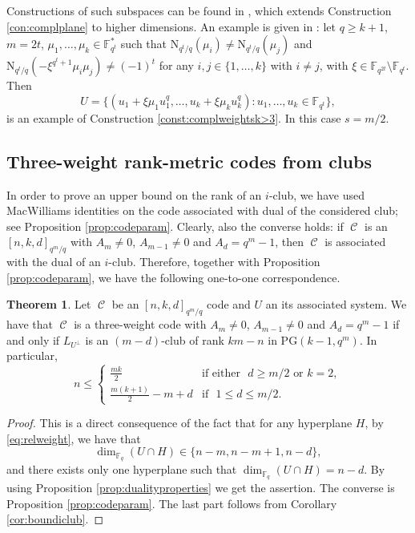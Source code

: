 \documentclass[11pt]{amsart}
\DeclareMathOperator{\C}{\mathcal{C}}
\theoremstyle{definition}
\newtheorem{theorem}{Theorem}[section]
\newcommand{\F}{{\mathbb F}}
\newcommand{\fq}{{\mathbb F}_{q}}
\newcommand{\N}{\mathrm{N}}
\begin{document}
Constructions of such subspaces can be found in \cite{zullo2021multi}, which extends Construction \ref{con:complplane} to higher dimensions.
An example is given in \cite[Corollary 6.8]{zullo2021multi}:
let $q\geq k+1$, $m=2t$, $\mu_1,\ldots,\mu_k \in \F_{q^t}^*$ such that $\N_{q^t/q}(\mu_i) \neq \N_{q^t/q}(\mu_j)$ and $\N_{q^{t}/q}(-\xi^{q^t+1}\mu_i\mu_j)\neq (-1)^t$ for any $i,j \in \{1,\ldots,k\}$ with $i\ne j$, 
with $\xi \in \F_{q^{2t}}\setminus\F_{q^t}$.
Then
\[ U=\{ (u_1+\xi \mu_1 u_1^{q},\ldots,u_k+\xi \mu_k u_k^{q}) \colon u_1,\ldots,u_k \in \F_{q^t} \}, \]
is an example of Construction \ref{const:complweightsk>3}.
In this case $s=m/2$.

\subsection{Three-weight rank-metric codes from clubs}

In order to prove an upper bound on the rank of an $i$-club, we have used MacWilliams identities on the code associated with dual of the considered club; see Proposition \ref{prop:codeparam}. Clearly, also the converse holds: if $\C$ is an $[n,k,d]_{q^m/q}$ with $A_{m}\ne 0$, $A_{m-1}\ne 0$ and $A_d=q^m-1$, then $\C$ is associated with the dual of an $i$-club.
Therefore, together with Proposition \ref{prop:codeparam}, we have the following one-to-one correspondence.

\begin{theorem}
    Let $\C$ be an $[n,k,d]_{q^m/q}$ code and $U$ an its associated system. 
    We have that $\C$ is a three-weight code with $A_{m}\ne 0$, $A_{m-1}\ne 0$ and $A_d=q^m-1$ if and only if $L_{U^\perp}$ is an $(m-d)$-club of rank $km-n$ in $\mathrm{PG}(k-1,q^m)$.
    In particular,
    \[ n\leq  
    \begin{cases}
        \frac{mk}2 & \text{if either }\,\, d\geq m/2 \,\, \text{or } k=2,\\
        \frac{m(k+1)}2-m+d & \text{if }\,\, 1\leq d\leq m/2.
    \end{cases}
    \]
\end{theorem}
\begin{proof}
    This is a direct consequence of the fact that for any hyperplane $H$, by \eqref{eq:relweight}, we have that
    \[ \dim_{\fq}(U\cap H)\in\{n-m,n-m+1,n-d\}, \]
    and there exists only one hyperplane such that $\dim_{\fq}(U\cap H)=n-d$.
    By using Proposition \ref{prop:dualityproperties} we get the assertion.
    The converse is Proposition \ref{prop:codeparam}.
    The last part follows from Corollary \ref{cor:boundiclub}.
\end{proof}
\end{document}
